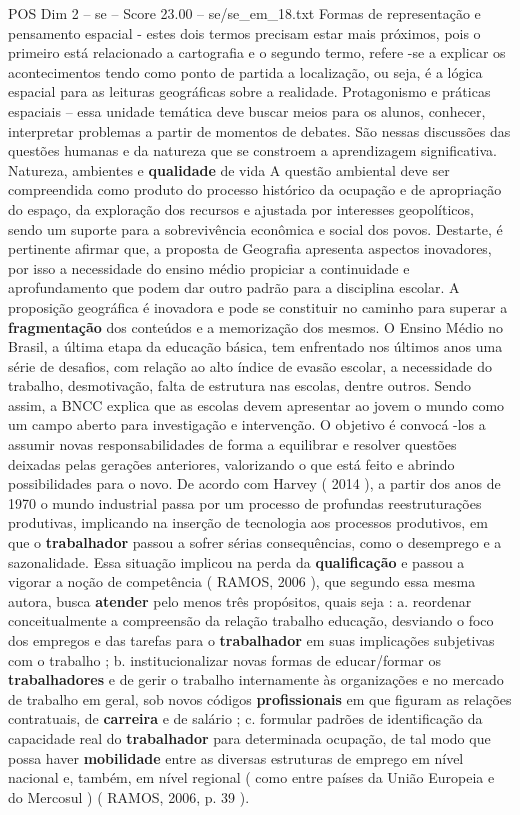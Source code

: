 \begin{textsample}{POS Dim 2 – se – Score 23.00 – se/se\_em\_18.txt}
Formas de representação e pensamento espacial - estes dois termos precisam estar mais próximos, pois o primeiro está relacionado a cartografia e o segundo termo, refere -se a explicar os acontecimentos tendo como ponto de partida a localização, ou seja, é a lógica espacial para as leituras geográficas sobre a realidade.
Protagonismo e práticas espaciais – essa unidade temática deve buscar meios para os alunos, conhecer, interpretar problemas a partir de momentos de debates.
São nessas discussões das questões humanas e da natureza que se constroem a aprendizagem significativa.
Natureza, ambientes e \textbf{qualidade} de vida A questão ambiental deve ser compreendida como produto do processo histórico da ocupação e de apropriação do espaço, da exploração dos recursos e ajustada por interesses geopolíticos, sendo um suporte para a sobrevivência econômica e social dos povos.
Destarte, é pertinente afirmar que, a proposta de Geografia apresenta aspectos inovadores, por isso a necessidade do ensino médio propiciar a continuidade e aprofundamento que podem dar outro padrão para a disciplina escolar.
A proposição geográfica é inovadora e pode se constituir no caminho para superar a \textbf{fragmentação} dos conteúdos e a memorização dos mesmos.
O Ensino Médio no Brasil, a última etapa da educação básica, tem enfrentado nos últimos anos uma série de desafios, com relação ao alto índice de evasão escolar, a necessidade do trabalho, desmotivação, falta de estrutura nas escolas, dentre outros.
Sendo assim, a BNCC explica que as escolas devem apresentar ao jovem o mundo como um campo aberto para investigação e intervenção.
O objetivo é convocá -los a assumir novas responsabilidades de forma a equilibrar e resolver questões deixadas pelas gerações anteriores, valorizando o que está feito e abrindo possibilidades para o novo.
De acordo com Harvey ( 2014 ), a partir dos anos de 1970 o mundo industrial passa por um processo de profundas reestruturações produtivas, implicando na inserção de tecnologia aos processos produtivos, em que o \textbf{trabalhador} passou a sofrer sérias consequências, como o desemprego e a sazonalidade.
Essa situação implicou na perda da \textbf{qualificação} e passou a vigorar a noção de competência ( RAMOS, 2006 ), que segundo essa mesma autora, busca \textbf{atender} pelo menos três propósitos, quais seja : a. reordenar conceitualmente a compreensão da relação trabalho educação, desviando o foco dos empregos e das tarefas para o \textbf{trabalhador} em suas implicações subjetivas com o trabalho ; b. institucionalizar novas formas de educar/formar os \textbf{trabalhadores} e de gerir o trabalho internamente às organizações e no mercado de trabalho em geral, sob novos códigos \textbf{profissionais} em que figuram as relações contratuais, de \textbf{carreira} e de salário ; c. formular padrões de identificação da capacidade real do \textbf{trabalhador} para determinada ocupação, de tal modo que possa haver \textbf{mobilidade} entre as diversas estruturas de emprego em nível nacional e, também, em nível regional ( como entre países da União Europeia e do Mercosul ) ( RAMOS, 2006, p. 39 ).

\end{textsample}
